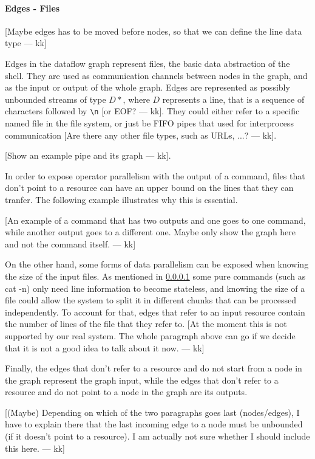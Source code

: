 \documentclass[sigplan,10pt,review,anonymous]{acmart}
\newcommand{\kk}[1]{[{\color{magenta}#1 --- kk}]}
\begin{document}
\paragraph{Edges - Files}

\kk{Maybe edges has to be moved before nodes, so that we can define
  the line data type}

Edges in the dataflow graph represent files, the basic data
abstraction of the shell. They are used as communication channels
between nodes in the graph, and as the input or output of the whole
graph. Edges are represented as possibly unbounded streams of type
$D*$, where $D$ represents a line, that is a sequence of characters
followed by \verb|\n| \kk{or EOF?}. They could either refer to a
specific named file in the file system, or just be FIFO pipes that
used for interprocess communication \kk{Are there any other file
  types, such as URLs, ...?}.

\kk{Show an example pipe and its graph}.

In order to expose operator parallelism with the output of a command,
files that don't point to a resource can have an upper bound on the
lines that they can tranfer. The following example illustrates why
this is essential.

\kk{An example of a command that has two outputs and one goes to one
  command, while another output goes to a different one. Maybe only
  show the graph here and not the command itself.}

On the other hand, some forms of data parallelism can be exposed when
knowing the size of the input files. As mentioned in \ref{} some pure
commands (such as cat -n) only need line information to become
stateless, and knowing the size of a file could allow the system to
split it in different chunks that can be processed independently. To
account for that, edges that refer to an input resource contain the
number of lines of the file that they refer to. \kk{At the moment this
  is not supported by our real system. The whole paragraph above can
  go if we decide that it is not a good idea to talk about it now.}

Finally, the edges that don't refer to a resource and do not start
from a node in the graph represent the graph input, while the edges
that don't refer to a resource and do not point to a node in the graph
are its outputs.

\kk{(Maybe) Depending on which of the two paragraphs goes last
  (nodes/edges), I have to explain there that the last incoming edge
  to a node must be unbounded (if it doesn't point to a resource). I
  am actually not sure whether I should include this here.}
\end{document}
